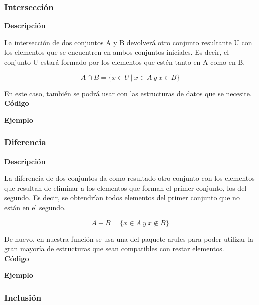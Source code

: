 \subsubsection{Intersecci\'on}

    \textbf{Descripci\'on}
    
    La intersecci\'on de dos conjuntos A y B devolver\'a otro conjunto resultante U con los elementos 
    que se encuentren en ambos conjuntos iniciales. Es decir, el conjunto U estar\'a formado por los elementos 
    que est\'en tanto en A como en B.

    \[
    A \cap B = \{x\in U ~ | ~ x\in A ~ y ~ x\in B \}
    \]

    En este caso, tambi\'en se podr\'a usar con las estructuras de datos que se necesite.
    \\


    \textbf{C\'odigo}

    
    
    \textbf{Ejemplo}




\subsubsection{Diferencia}

    \textbf{Descripci\'on}

    La diferencia de dos conjuntos da como resultado otro conjunto con los elementos que resultan de 
    eliminar a los elementos que forman el primer conjunto, los del segundo. Es decir, se obtendr\'ian 
    todos elementos del primer conjunto que no est\'an en el segundo.

    \[
    A - B = \{x\in A ~ y ~ x\notin B \}
    \]

    De nuevo, en nuestra funci\'on se usa una del paquete arules para poder utilizar la gran mayor\'ia de estructuras 
    que sean compatibles con restar elementos.
    \\


    \textbf{C\'odigo}

    
    
    \textbf{Ejemplo}


\subsubsection{Inclusi\'on}

